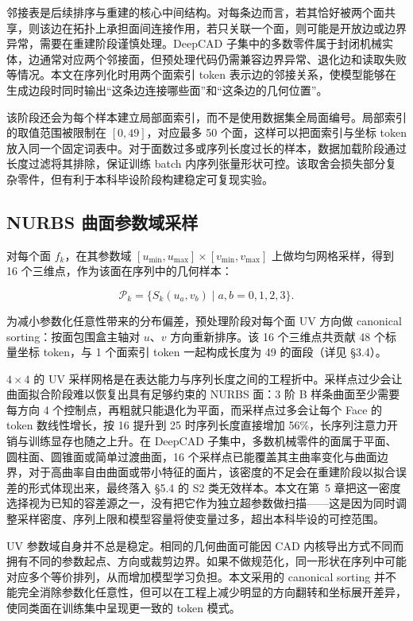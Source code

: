邻接表是后续排序与重建的核心中间结构。对每条边而言，若其恰好被两个面共享，则该边在拓扑上承担面间连接作用，若只关联一个面，则可能是开放边或边界异常，需要在重建阶段谨慎处理。DeepCAD 子集中的多数零件属于封闭机械实体，边通常对应两个邻接面，但预处理代码仍需兼容边界异常、退化边和读取失败等情况。本文在序列化时用两个面索引 token 表示边的邻接关系，使模型能够在生成边段时同时输出“这条边连接哪些面”和“这条边的几何位置”。

该阶段还会为每个样本建立局部面索引，而不是使用数据集全局面编号。局部索引的取值范围被限制在 $[0,49]$，对应最多 50 个面，这样可以把面索引与坐标 token 放入同一个固定词表中。对于面数过多或序列长度过长的样本，数据加载阶段通过长度过滤将其排除，保证训练 batch 内序列张量形状可控。该取舍会损失部分复杂零件，但有利于本科毕设阶段构建稳定可复现实验。

\subsection{NURBS 曲面参数域采样}

对每个面 $f_k$，在其参数域 $[u_{\min}, u_{\max}] \times [v_{\min}, v_{\max}]$ 上做均匀网格采样，得到 16 个三维点，作为该面在序列中的几何样本：

\begin{equation}
    \mathcal{P}_k = \{ S_k(u_a, v_b) \mid a, b = 0, 1, 2, 3 \}.
    \label{eq:face-uv-sampling}
\end{equation}

为减小参数化任意性带来的分布偏差，预处理阶段对每个面 UV 方向做 canonical sorting：按面包围盒主轴对 $u$、$v$ 方向重新排序。该 16 个三维点共贡献 48 个标量坐标 token，与 1 个面索引 token 一起构成长度为 49 的面段（详见 §3.4）。

$4 \times 4$ 的 UV 采样网格是在表达能力与序列长度之间的工程折中。采样点过少会让曲面拟合阶段难以恢复出具有足够约束的 NURBS 面：3 阶 B 样条曲面至少需要每方向 4 个控制点，再粗就只能退化为平面，而采样点过多会让每个 Face 的 token 数线性增长，按 16 提升到 25 时序列长度直接增加 56\%，长序列注意力开销与训练显存也随之上升。在 DeepCAD 子集中，多数机械零件的面属于平面、圆柱面、圆锥面或简单过渡曲面，16 个采样点已能覆盖其主曲率变化与曲面边界，对于高曲率自由曲面或带小特征的面片，该密度的不足会在重建阶段以拟合误差的形式体现出来，最终落入 §5.4 的 S2 类无效样本。本文在第~5 章把这一密度选择视为已知的容差源之一，没有把它作为独立超参数做扫描——这是因为同时调整采样密度、序列上限和模型容量将使变量过多，超出本科毕设的可控范围。

UV 参数域自身并不总是稳定。相同的几何曲面可能因 CAD 内核导出方式不同而拥有不同的参数起点、方向或裁剪边界。如果不做规范化，同一形状在序列中可能对应多个等价排列，从而增加模型学习负担。本文采用的 canonical sorting 并不能完全消除参数化任意性，但可以在工程上减少明显的方向翻转和坐标展开差异，使同类面在训练集中呈现更一致的 token 模式。

